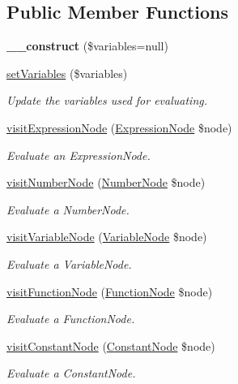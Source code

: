 \subsection*{Public Member Functions}
\begin{DoxyCompactItemize}
\item 
\hypertarget{classMathParser_1_1Interpreting_1_1Evaluator_aa41d08bd9b0d8b204c3ad8d04ce0ca9e}{{\bfseries \-\_\-\-\_\-construct} (\$variables=null)}\label{classMathParser_1_1Interpreting_1_1Evaluator_aa41d08bd9b0d8b204c3ad8d04ce0ca9e}

\item 
\hyperlink{classMathParser_1_1Interpreting_1_1Evaluator_ada67630eccaad9b2c496eaf320b9303c}{set\-Variables} (\$variables)
\begin{DoxyCompactList}\small\item\em Update the variables used for evaluating. \end{DoxyCompactList}\item 
\hyperlink{classMathParser_1_1Interpreting_1_1Evaluator_af8dbfe9e89ba2450ca2e070dc39e47e8}{visit\-Expression\-Node} (\hyperlink{classMathParser_1_1Parsing_1_1Nodes_1_1ExpressionNode}{Expression\-Node} \$node)
\begin{DoxyCompactList}\small\item\em Evaluate an Expression\-Node. \end{DoxyCompactList}\item 
\hyperlink{classMathParser_1_1Interpreting_1_1Evaluator_a1ce6d1017e55901a580256a2f1edd027}{visit\-Number\-Node} (\hyperlink{classMathParser_1_1Parsing_1_1Nodes_1_1NumberNode}{Number\-Node} \$node)
\begin{DoxyCompactList}\small\item\em Evaluate a Number\-Node. \end{DoxyCompactList}\item 
\hyperlink{classMathParser_1_1Interpreting_1_1Evaluator_a67cd18f0dc33f6e2755008053cd8cc0a}{visit\-Variable\-Node} (\hyperlink{classMathParser_1_1Parsing_1_1Nodes_1_1VariableNode}{Variable\-Node} \$node)
\begin{DoxyCompactList}\small\item\em Evaluate a Variable\-Node. \end{DoxyCompactList}\item 
\hyperlink{classMathParser_1_1Interpreting_1_1Evaluator_a455ab6d3c963aeb2e3ad0c731c8bc081}{visit\-Function\-Node} (\hyperlink{classMathParser_1_1Parsing_1_1Nodes_1_1FunctionNode}{Function\-Node} \$node)
\begin{DoxyCompactList}\small\item\em Evaluate a Function\-Node. \end{DoxyCompactList}\item 
\hyperlink{classMathParser_1_1Interpreting_1_1Evaluator_a257b2634d88050c7e51de91c5f09b7b8}{visit\-Constant\-Node} (\hyperlink{classMathParser_1_1Parsing_1_1Nodes_1_1ConstantNode}{Constant\-Node} \$node)
\begin{DoxyCompactList}\small\item\em Evaluate a Constant\-Node. \end{DoxyCompactList}\end{DoxyCompactItemize}
